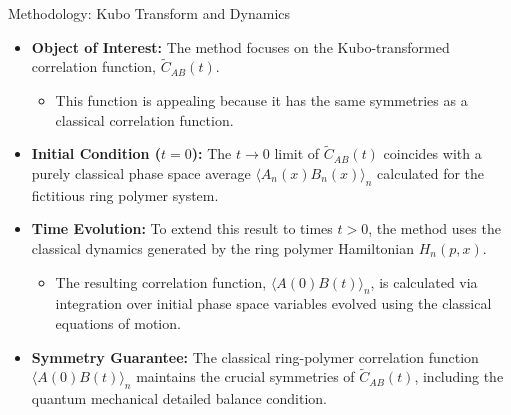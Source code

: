 \begin{frame}{Methodology: Kubo Transform and Dynamics}

\begin{itemize}
    \item \textbf{Object of Interest:} The method focuses on the Kubo-transformed correlation function, $\tilde{C}_{AB}(t)$.
    \begin{itemize}
        \item This function is appealing because it has the same symmetries as a classical correlation function.
    \end{itemize}

    \item \textbf{Initial Condition ($t=0$):} The $t \to 0$ limit of $\tilde{C}_{AB}(t)$ coincides with a purely classical phase space average $\langle A_n(x) B_n(x) \rangle_n$ calculated for the fictitious ring polymer system.
    
    \item \textbf{Time Evolution:} To extend this result to times $t > 0$, the method uses the classical dynamics generated by the ring polymer Hamiltonian $H_n(p,x)$.
    \begin{itemize}
        \item The resulting correlation function, $\langle A(0)B(t) \rangle_n$, is calculated via integration over initial phase space variables evolved using the classical equations of motion.
    \end{itemize}
    
    \item \textbf{Symmetry Guarantee:} The classical ring-polymer correlation function $\langle A(0)B(t) \rangle_n$ maintains the crucial symmetries of $\tilde{C}_{AB}(t)$, including the quantum mechanical detailed balance condition.
\end{itemize}
\end{frame}

